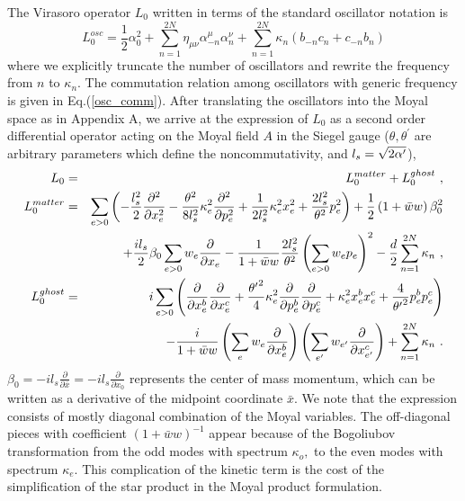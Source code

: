 \documentclass[a4paper,aps,preprint,nofootinbib,eqsecnum]{revtex4}
\begin{document}
The Virasoro operator $L_{0}$ written in terms of the standard oscillator
notation is
\begin{equation}
L_{0}^{osc}=\frac{1}{2}\alpha _{0}^{2}+\sum_{n=1}^{2N}\eta _{\mu \nu }\alpha
_{-n}^{\mu }\alpha _{n}^{\nu }+\sum_{n=1}^{2N}\kappa
_{n}(b_{-n}c_{n}+c_{-n}b_{n})
\end{equation}%
where we explicitly truncate the number of oscillators and rewrite the
frequency from $n$ to $\kappa _{n}$. The commutation relation among
oscillators with generic frequency is given in Eq.(\ref{osc_comm}). After
translating the oscillators into the Moyal space as in Appendix A, we arrive
at the expression of $L_{0}$ as a second order differential operator acting
on the Moyal field $A$ in the Siegel gauge ($\theta ,{\theta ^{\prime }}$
are arbitrary parameters which define the noncommutativity, and $l_{s}=\sqrt{%
2{\alpha ^{\prime }}}$),
\begin{eqnarray}
L_{0} &=&L_{0}^{matter}+L_{0}^{ghost}\,\,, \\
L_{0}^{matter} &=&\sum_{e>0}\left( -\frac{l_{s}^{2}}{2}\frac{\partial ^{2}}{%
\partial x_{e}^{2}}-\frac{\theta ^{2}}{8l_{s}^{2}}\kappa _{e}^{2}\frac{%
\partial ^{2}}{\partial p_{e}^{2}}+\frac{1}{2l_{s}^{2}}\kappa
_{e}^{2}x_{e}^{2}+\frac{2l_{s}^{2}}{\theta ^{2}}p_{e}^{2}\right) +\frac{1}{2}%
\left( 1+\bar{w}w\right) \beta _{0}^{2}  \notag \\
&&+\frac{il_{s}}{2}\beta _{0}\sum_{e>0}w_{e}\frac{\partial }{\partial x_{e}}-%
\frac{1}{1+\bar{w}w}\frac{2l_{s}^{2}}{\theta ^{2}}\left(
\sum_{e>0}w_{e}p_{e}\right) ^{2}-\frac{d}{2}\sum_{n=1}^{2N}\kappa _{n}
\,\,, \\
L_{0}^{ghost} &=&i\sum_{e>0}\left( \frac{\partial }{\partial x_{e}^{b}}\frac{%
\partial }{\partial x_{e}^{c}}+\frac{{\theta ^{\prime }}^{2}}{4}\kappa
_{e}^{2}\frac{\partial }{\partial p_{e}^{b}}\frac{\partial }{\partial
p_{e}^{c}}+\kappa _{e}^{2}x_{e}^{b}x_{e}^{c}+\frac{4}{{\theta ^{\prime }}^{2}%
}p_{e}^{b}p_{e}^{c}\right)   \notag \\
&&-\frac{i}{1+\bar{w}w}\left( \sum_{e}w_{e}\frac{\partial }{\partial
x_{e}^{b}}\right) \left( \sum_{e^{\prime }}w_{e^{\prime }}\frac{\partial }{%
\partial x_{e^{\prime }}^{c}}\right) +\sum_{n=1}^{2N}\kappa _{n}\,\,.
\end{eqnarray}%
$\beta _{0}=-il_{s}\frac{\partial }{\partial \bar{x}}=-il_{s}\frac{\partial
}{\partial x_{0}}$ represents the center of mass momentum, which can be
written as a derivative of the midpoint coordinate $\bar{x}$. We note that
the expression consists of mostly diagonal combination of the Moyal
variables. The off-diagonal pieces with coefficient $(1+\bar{w}w)^{-1}$
appear because of the Bogoliubov transformation from the odd modes with
spectrum $\kappa _{o},$ to the even modes with spectrum $\kappa _{e}$. This
complication of the kinetic term is the cost of the simplification of the
star product in the Moyal product formulation.
\end{document}
